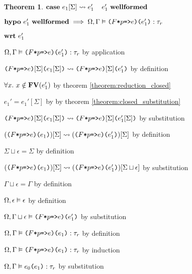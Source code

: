 \documentclass[acmsmall]{acmart}
\theoremstyle{definition}
\newtheorem{theorem}{Theorem}[section]
\begin{document}
\begin{theorem}
  \item \Z\Z $\B{case}\ e_1[\Sigma] \rightsquigarrow e_1' \I e_1'\ \B{wellformed}$
  \item \Z\Z $\textbf{hypo}\ e_1'\ \textbf{wellformed} \implies \Omega, \Gamma \vDash \texttt{($F$*$p$=>$e$)($e_1'$)} : \tau_r$
  \item \Z\Z $\textbf{wrt}\ e_1' $
  \item \Z\Z\Z $\Omega, \Gamma \vDash \texttt{($F$*$p$=>$e$)($e_1'$)} : \tau_r$ by application
  \item \Z\Z\Z $\texttt{($F$*$p$=>$e$)$[\Sigma]$($e_1[\Sigma]$)} \rightsquigarrow \texttt{($F$*$p$=>$e$)$[\Sigma]$($e_1'$)}$ by definition 
  \item \Z\Z\Z $\forall x .\ x \notin \textbf{FV}(e_1')$ by theorem \ref{theorem:reduction_closed} 
  \item \Z\Z\Z $e_1' = e_1'[\Sigma]$ by by theorem \ref{theorem:closed_substitution} 
  \item \Z\Z\Z $\texttt{($F$*$p$=>$e$)$[\Sigma]$($e_1[\Sigma]$)} \rightsquigarrow \texttt{($F$*$p$=>$e$)$[\Sigma]$($e_1'[\Sigma]$)}$ by substitution 
  \item \Z\Z\Z $(\texttt{($F$*$p$=>$e$)($e_1$)})[\Sigma] \rightsquigarrow (\texttt{($F$*$p$=>$e$)($e_1'$)})[\Sigma]$ by definition 
  \item \Z\Z\Z $\Sigma \sqcup \epsilon = \Sigma$ by definition 
  \item \Z\Z\Z $(\texttt{($F$*$p$=>$e$)($e_1$)})[\Sigma] \rightsquigarrow (\texttt{($F$*$p$=>$e$)($e_1'$)})[\Sigma \sqcup \epsilon]$ by substitution 
  \item \Z\Z\Z $\Gamma \sqcup \epsilon = \Gamma$ by definition
  \item \Z\Z\Z $\Omega, \epsilon \vDash \epsilon$ by definition
  \item \Z\Z\Z $\Omega, \Gamma \sqcup \epsilon \vDash \texttt{($F$*$p$=>$e$)($e_1'$)}$ by substitution 
  \item \Z\Z\Z $\Omega, \Gamma \vDash \texttt{($F$*$p$=>$e$)}\texttt{(}e_1\texttt{)} : \tau_r$ by definition
  \item \Z\Z $\Omega, \Gamma \vDash \texttt{($F$*$p$=>$e$)}\texttt{(}e_1\texttt{)} : \tau_r$ by induction
  \item \Z\Z $\Omega, \Gamma \vDash e_0\texttt{(}e_1\texttt{)} : \tau_r$ by substitution 



\end{theorem}
\end{document}

